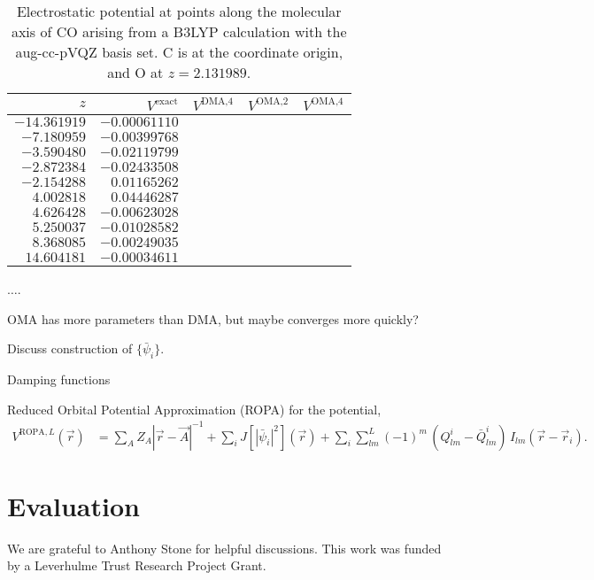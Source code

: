 \documentclass[journal=jacsat,manuscript=article]{achemso}
\begin{document}
\begin{table}[h]
    \centering
    \begin{tabular}{r|rrrr|}
        $z$ & $V^{\text{exact}}$ 
        &$V^{\text{DMA,4}}$
        &$V^{\text{OMA,2}}$
        &$V^{\text{OMA,4}}$
        \\
        \hline
         $-14.361919$ & $-0.00061110$\\
         $-7.180959 $ & $-0.00399768$\\
         $-3.590480$ & $-0.02119799$ \\
         $-2.872384$ & $-0.02433508$ \\
         $-2.154288$ & $0.01165262$ \\
         $4.002818$ & $0.04446287$\\
         $4.626428$ & $-0.00623028$\\
         $5.250037$ & $-0.01028582$\\
         $8.368085$ & $-0.00249035$\\
         $14.604181$ & $-0.00034611$\\
         \hline
    \end{tabular}
    \caption{Electrostatic potential at points along the molecular axis of CO arising from a B3LYP calculation with the aug-cc-pVQZ basis set. C is at the coordinate origin, and O at $z=2.131989$. }
    \label{tab:1}
\end{table}
$\dots$.

OMA has more parameters than DMA, but maybe converges more quickly?

Discuss construction of $\{\bar\psi_i\}$.

Damping functions\cite{Koide1981a,Tang1984AnCoefficients,Knowles1986,Knowles1986a,Knowles1987a}

Reduced Orbital Potential Approximation (ROPA) for the potential,
\begin{align}
    V^{\text{ROPA},L}(\vec r) &=
    \sum_A Z_A |\vec r
    - \vec A|^{-1}
    +\sum_i J\left[\left|\bar\psi_i\right|^2\right](\vec r)
    +\sum_i \sum_{lm}^L (-1)^m\,\left(Q^i_{lm}-\bar Q^i_{lm}\right)\, I_{lm}(\vec r - \vec r_i)
    .
\end{align}
\section{Evaluation}

\begin{acknowledgement}

We are grateful to Anthony Stone for helpful discussions.
This work was funded by a Leverhulme Trust Research Project Grant.

\end{acknowledgement}

\begin{suppinfo}


\end{suppinfo}


\end{document}
